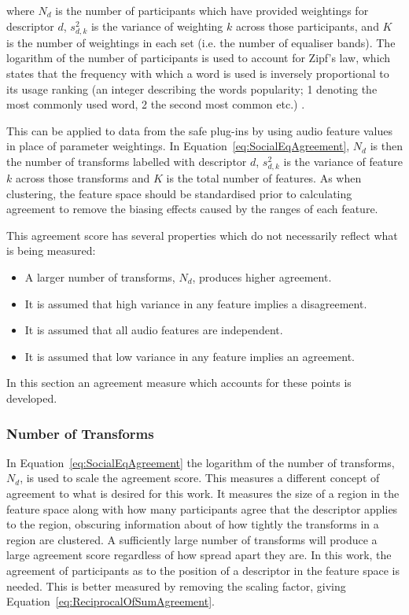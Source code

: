 		where $N_{d}$ is the number of participants which have provided weightings for descriptor $d$,
		$s_{d,k}^{2}$ is the variance of weighting $k$ across those participants, and $K$ is the number of
		weightings in each set (i.e. the number of equaliser bands). The logarithm of the number of
		participants is used to account for Zipf's law, which states that the frequency with which a word is used
		is inversely proportional to its usage ranking (an integer describing the words popularity; 1 denoting the
		most commonly used word, 2 the second most common etc.) \citep{manning1999foundations}.

		This can be applied to data from the \acrshort{safe} plug-ins by using audio feature values in place of
		parameter weightings. In Equation~\ref{eq:SocialEqAgreement}, $N_{d}$ is then the number of transforms
		labelled with descriptor $d$, $s_{d,k}^{2}$ is the variance of feature $k$ across those transforms and $K$
		is the total number of features. As when clustering, the feature space should be standardised prior to
		calculating agreement to remove the biasing effects caused by the ranges of each feature.

		This agreement score has several properties which do not necessarily reflect what is being measured:

		\begin{itemize}
			\item A larger number of transforms, $N_{d}$, produces higher agreement.
			\item It is assumed that high variance in any feature implies a disagreement. 
			\item It is assumed that all audio features are independent. 
			\item It is assumed that low variance in any feature implies an agreement. 
		\end{itemize}

		In this section an agreement measure which accounts for these points is developed.

		\subsubsection*{Number of Transforms}
			In Equation~\ref{eq:SocialEqAgreement} the logarithm of the number of transforms, $N_{d}$, is used
			to scale the agreement score. This measures a different concept of agreement to what is desired for
			this work. It measures the size of a region in the feature space along with how many participants
			agree that the descriptor applies to the region, obscuring information about of how tightly the
			transforms in a region are clustered. A sufficiently large number of transforms will produce a
			large agreement score regardless of how spread apart they are. In this work, the agreement of
			participants as to the position of a descriptor in the feature space is needed. This is better
			measured by removing the scaling factor, giving Equation~\ref{eq:ReciprocalOfSumAgreement}.

